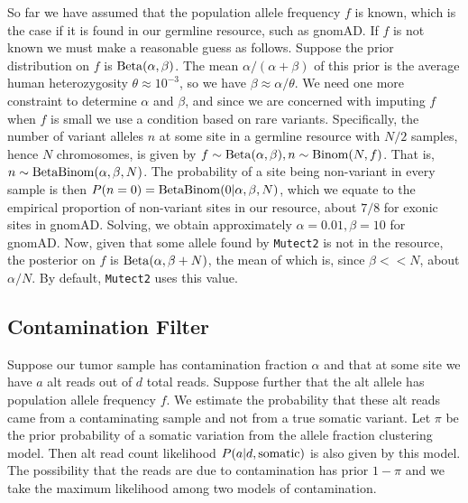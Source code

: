\documentclass[nofootinbib,amssymb,amsmath]{revtex4}
\newcommand{\code}[1]{\texttt{#1}}
\begin{document}
So far we have assumed that the population allele frequency $f$ is known, which is the case if it is found in our germline resource, such as gnomAD.  If $f$ is not known we must make a reasonable guess as follows.  Suppose the prior distribution on $f$ is ${\rm Beta}(\alpha, \beta)$.  The mean $\alpha/(\alpha +\beta)$ of this prior is the average human heterozygosity $\theta \approx 10^{-3}$, so we have $\beta \approx \alpha / \theta$.  We need one more constraint to determine $\alpha$ and $\beta$, and since we are concerned with imputing $f$ when $f$ is small we use a condition based on rare variants.  Specifically, the number of variant alleles $n$ at some site in a germline resource with $N/2$ samples, hence $N$ chromosomes, is given by $f \sim {\rm Beta}(\alpha, \beta), n \sim {\rm Binom}(N,f)$.  That is, $n \sim {\rm BetaBinom}(\alpha, \beta, N)$.  The probability of a site being non-variant in every sample is then $P(n = 0) = {\rm BetaBinom}(0 | \alpha, \beta, N)$, which we equate to the empirical proportion of non-variant sites in our resource, about $7/8$ for exonic sites in gnomAD.  Solving, we obtain approximately $\alpha = 0.01, \beta = 10$ for gnomAD.  Now, given that some allele found by \code{Mutect2} is not in the resource, the posterior on $f$ is ${\rm Beta}(\alpha, \beta + N)$, the mean of which is, since $\beta << N$, about $\alpha / N$.  By default, \code{Mutect2} uses this value.

\subsection{Contamination Filter}\label{contamination-filter}
Suppose our tumor sample has contamination fraction $\alpha$ and that at some site we have $a$ alt reads out of $d$ total reads.  Suppose further that the alt allele has population allele frequency $f$.  We estimate the probability that these alt reads came from a contaminating sample and not from a true somatic variant.  Let $\pi$ be the prior probability of a somatic variation from the allele fraction clustering model.  Then alt read count likelihood $P(a | d, {\rm somatic})$ is also given by this model.  The possibility that the reads are due to contamination has prior $1 - \pi$ and we take the maximum likelihood among two models of contamination.
\end{document}
